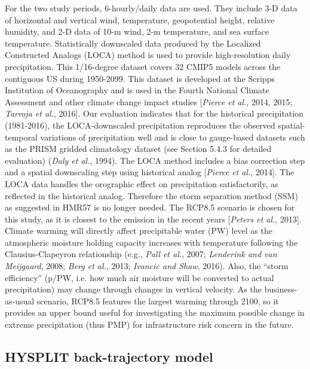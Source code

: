 For the two study periods, 6-hourly/daily data are used. They include 3-D data of horizontal and vertical wind, temperature, geopotential height, relative humidity, and 2-D data of 10-m wind, 2-m temperature, and sea surface temperature. Statistically downscaled data produced by the Localized Constructed Analogs (LOCA) method is used to provide high-resolution daily precipitation. This 1/16-degree dataset covers 32 CMIP5 models across the contiguous US during 1950-2099. This dataset is developed at the Scripps Institution of Oceanography and is used in the Fourth National Climate Assessment and other climate change impact studies [\textit{Pierce et al.}, 2014, 2015;\textit{ Tarroja et al.}, 2016]. Our evaluation indicates that for the historical precipitation (1981-2016), the LOCA-downscaled precipitation reproduces the observed spatial-temporal variations of precipitation well and is close to gauge-based datasets such as the PRISM gridded climatology dataset (see Section 5.4.3 for detailed evaluation) (\textit{Daly et al.}, 1994). The LOCA method includes a bias correction step and a spatial downscaling step using historical analog [\textit{Pierce et al.}, 2014]. The LOCA data handles the orographic effect on precipitation satisfactorily, as reflected in the historical analog. Therefore the storm separation method (SSM) as suggested in HMR57 is no longer needed. The RCP8.5 scenario is chosen for this study, as it is closest to the emission in the recent years [\textit{Peters et al.}, 2013]. Climate warming will directly affect precipitable water (PW) level as the atmospheric moisture holding capacity increases with temperature following the Clausius-Clapeyron relationship (e.g., \textit{Pall et al.}, 2007; \textit{Lenderink and van Meijgaard}, 2008; \textit{Berg et al.}, 2013; \textit{Ivancic and Shaw}, 2016). Also, the “storm efficiency” (p/PW, i.e. how much air moisture will be converted to actual precipitation) may change through changes in vertical velocity. As the business-as-usual scenario, RCP8.5 features the largest warming through 2100, so it provides an upper bound useful for investigating the maximum possible change in extreme precipitation (thus PMP) for infrastructure risk concern in the future.

\subsection{HYSPLIT back-trajectory model}

